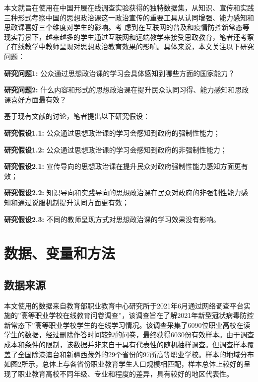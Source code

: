 \documentclass[
  12pt,
]{ctexart}
\begin{document}
本文就旨在使用在中国开展在线调查实验获得的独特数据集，从知识、宣传和实践三种形式考察中国的思想政治课这一政治宣传的重要工具从认同增强、能力感知和思政课喜好三个维度对学生的影响。考
虑到在互联网的普及和疫情防控新常态等现实背景下，越来越多的学生通过互联网和远端教学来接受思政教育，笔者还考察了在线教学中教师呈现对思想政治教育效果的影响。具体来说，本文关注以下研究问题：

\textbf{研究问题1:} 公众通过思想政治课的学习会具体感知到哪些方面的国家能力？

\textbf{研究问题2:} 什么内容和形式的思想政治课在提升民众认同习得、能力感知和思政课喜好方面最有效？

基于现有文献的讨论，笔者提出以下研究假设：

\textbf{研究假设1.1:} 公众通过思想政治课的学习会感知到政府的强制性能力；

\textbf{研究假设1.2:} 公众通过思想政治课的学习会感知到政府的非强制性能力；

\textbf{研究假设2.1:} 宣传导向的思想政治课在提升民众对政府强制性能力感知方面更有效；

\textbf{研究假设2.2:} 知识导向和实践导向的思想政治课在民众对政府的非强制性能力感知和通过说服机制提升认同方面更有效；

\textbf{研究假设2.3:} 不同的教师呈现方式对思想政治课的学习效果没有影响。

\hypertarget{ux6570ux636eux53d8ux91cfux548cux65b9ux6cd5}{%
\section{数据、变量和方法}\label{ux6570ux636eux53d8ux91cfux548cux65b9ux6cd5}}

\hypertarget{ux6570ux636eux6765ux6e90}{%
\subsection{数据来源}\label{ux6570ux636eux6765ux6e90}}

本文使用的数据来自教育部职业教育中心研究所于2021年6月通过网络调查平台实施的''高等职业学校在线教育问卷调查''，该调查旨在了解2021年新型冠状病毒防控新常态下''高等职业学校学生的在线学习情况。该调查采集了6090位职业高校在读学生的数据，经过删除作答时间较短的问卷，最终获得6030份有效样本。由于调查成本和条件的限制，该数据并非来自于具有代表性的随机抽样调查。但调查样本覆盖了全国除港澳台和新疆西藏外的29个省份的97所高等职业学校。样本的地域分布如图2所示，总体上与各省份职业教育学生人口规模相匹配，样本总体上较好的呈现了职业教育高校不同年级、专业和程度的差异，具有较好的地区代表性。
\end{document}
